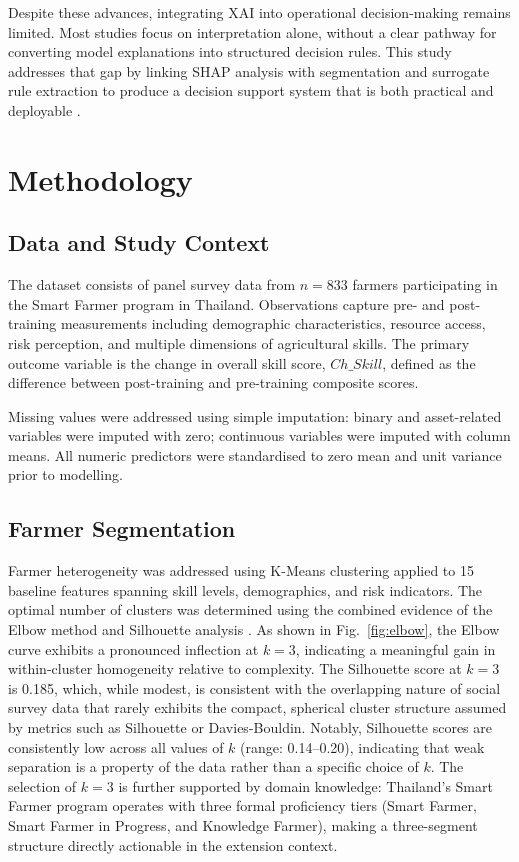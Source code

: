 \documentclass[3p,twocolumn,authoryear]{elsarticle}
\begin{document}
Despite these advances, integrating XAI into operational
decision-making remains limited.
Most studies focus on interpretation alone, without a clear pathway
for converting model explanations into structured decision rules.
This study addresses that gap by linking SHAP analysis with
segmentation and surrogate rule extraction to produce a decision
support system that is both practical and deployable
\citep{yang2025,zhang2026}.

\section{Methodology}

\subsection{Data and Study Context}

The dataset consists of panel survey data from $n = 833$ farmers
participating in the Smart Farmer program in Thailand.
Observations capture pre- and post-training measurements including
demographic characteristics, resource access, risk perception, and
multiple dimensions of agricultural skills.
The primary outcome variable is the change in overall skill score,
$Ch\_Skill$, defined as the difference between post-training and
pre-training composite scores.

Missing values were addressed using simple imputation: binary and
asset-related variables were imputed with zero; continuous variables
were imputed with column means.
All numeric predictors were standardised to zero mean and unit
variance prior to modelling.

\subsection{Farmer Segmentation}

Farmer heterogeneity was addressed using K-Means clustering
applied to 15 baseline features spanning skill levels,
demographics, and risk indicators.
The optimal number of clusters was determined using the combined
evidence of the Elbow method and Silhouette analysis
\citep{rouseeuw1987}.
As shown in Fig.~\ref{fig:elbow}, the Elbow curve exhibits a
pronounced inflection at $k = 3$, indicating a meaningful
gain in within-cluster homogeneity relative to complexity.
The Silhouette score at $k = 3$ is 0.185, which, while modest,
is consistent with the overlapping nature of social survey data
that rarely exhibits the compact, spherical cluster structure
assumed by metrics such as Silhouette or Davies-Bouldin.
Notably, Silhouette scores are consistently low across all values
of $k$ (range: 0.14--0.20), indicating that weak separation is
a property of the data rather than a specific choice of $k$.
The selection of $k = 3$ is further supported by domain knowledge:
Thailand's Smart Farmer program operates with three formal
proficiency tiers (Smart Farmer, Smart Farmer in Progress,
and Knowledge Farmer), making a three-segment structure directly
actionable in the extension context.
\end{document}
